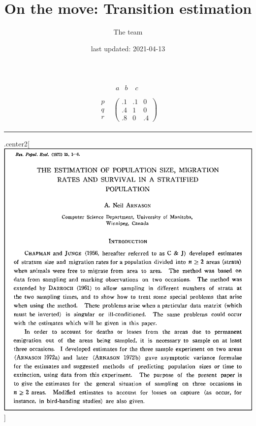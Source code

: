 \documentclass[
]{article}
\title{On the move: Transition estimation}
\author{The team}
\date{last updated: 2021-04-13}
\begin{document}
\maketitle

\begin{align*}
\begin{array}{cc} &
\begin{array}{ccc} a & b & \; c \\
\end{array}
\\
\begin{array}{ccc}
p \\
q\\
r
\end{array}
&
\left(
\begin{array}{ccc}
.1 & .1 & 0 \\
.4 & 1 & 0 \\
.8 & 0 & .4
\end{array}
\right)
\end{array}
\end{align*}

\begin{center}\rule{0.5\linewidth}{0.5pt}\end{center}

.center2{[} \includegraphics{img/arnason1973.png}{]}
\end{document}
